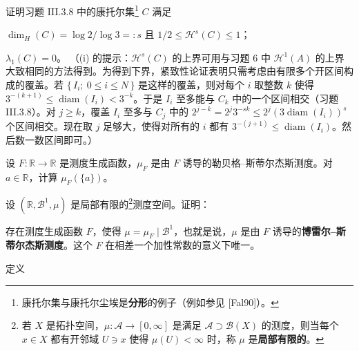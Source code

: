 \begin{exercises}
\item

证明习题 III.3.8 中的康托尔集\footnote{康托尔集与康托尔尘埃是\textbf{分形}的例子（例如参见 [Fal90]）。} $ C $ 满足

\begin{subitems}
\item

$ \dim_H(C) = \log 2 / \log 3 =: s $ 且 $ 1/2 \le \mathcal{H}^{s}(C) \le 1 $；

\item

$ \lambda_{1}(C) = 0 $。
（(i) 的提示：$ \mathcal{H}^{s}(C) $ 的上界可用与习题 6 中 $ \mathcal{H}^{1}(A) $ 的上界大致相同的方法得到。为得到下界，紧致性论证表明只需考虑由有限多个开区间构成的覆盖。若 $ \{\, I_{i} ;\ 0 \le i \le N \,\} $ 是这样的覆盖，则对每个 $ i $ 取整数 $ k $ 使得 $ 3^{-(k+1)} \le \operatorname{diam}(I_{i}) < 3^{-k} $。于是 $ I_{i} $ 至多能与 $ C_{k} $ 中的一个区间相交（习题 III.3.8）。对 $ j \ge k $，覆盖 $ I_{i} $ 至多与 $ C_{j} $ 中的 $ 2^{j-k} = 2^{j} 3^{-sk} \le 2^{j} (3 \operatorname{diam}(I_{i}))^{s} $ 个区间相交。现在取 $ j $ 足够大，使得对所有的 $ i $ 都有 $ 3^{-(j+1)} \le \operatorname{diam}(I_{i}) $。然后数一数区间即可。）

\end{subitems}

\item

设 $ F\colon \mathbb{R} \to \mathbb{R} $ 是测度生成函数，$ \mu_{F} $ 是由 $ F $ 诱导的勒贝格–斯蒂尔杰斯测度。对 $ a \in \mathbb{R} $，计算 $ \mu_{F}(\{a\}) $。

\item

设 $ (\mathbb{R}, \mathcal{B}^{1}, \mu) $ 是局部有限的\footnote{若 $ X $ 是拓扑空间，$ \mu\colon \mathcal{A} \to [0, \infty] $ 是满足 $ \mathcal{A} \supset \mathcal{B}(X) $ 的测度，则当每个 $ x \in X $ 都有开邻域 $ U \ni x $ 使得 $ \mu(U) < \infty $ 时，称 $ \mu $ 是\textbf{局部有限的}。}测度空间。证明：

\begin{subitems}
\item

存在测度生成函数 $ F $，使得 $ \mu = \mu_{F} \mid \mathcal{B}^{1} $，也就是说，$ \mu $ 是由 $ F $ 诱导的\textbf{博雷尔–斯蒂尔杰斯测度}。这个 $ F $ 在相差一个加性常数的意义下唯一。

\item

定义


\end{subitems}
\end{exercises}
